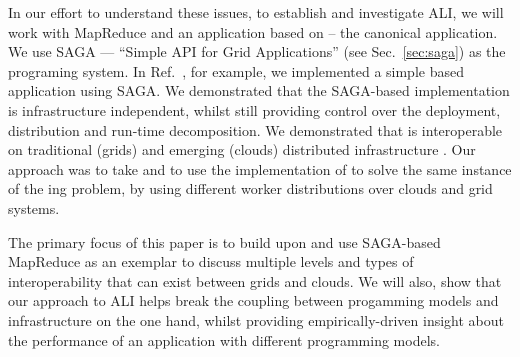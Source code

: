 \documentclass[3p,twocolumn]{elsarticle}
\begin{document}


In our effort to understand these issues, to establish and investigate
ALI, we will work with MapReduce and an application based on \mr --
the canonical \wc application.  We use SAGA --- “Simple API for Grid
Applications'' (see Sec.~\ref{sec:saga}) as the programing system.  In
Ref.~\cite{saga_ccgrid09}, for example, we implemented a simple \mr
based \wc application using SAGA.  We demonstrated that the SAGA-based
implementation is infrastructure independent, whilst still providing
control over the deployment, distribution and run-time decomposition.
We demonstrated that \sagamapreduce is interoperable on traditional
(grids) and emerging (clouds) distributed infrastructure
.  Our approach was to take \sagamapreduce and to
use the  implementation of \sagamapreduce to solve the same
instance of the {\wc}ing problem, by using different worker
distributions over clouds and grid systems.

The primary focus of this paper is to build upon and use SAGA-based
MapReduce as an exemplar to discuss multiple levels and types of
interoperability that can exist between grids and clouds. We will
also, show that our approach to ALI helps break the coupling between
progamming models and infrastructure on the one hand, whilst providing
empirically-driven insight about the performance of an application
with different programming models.
\end{document}
